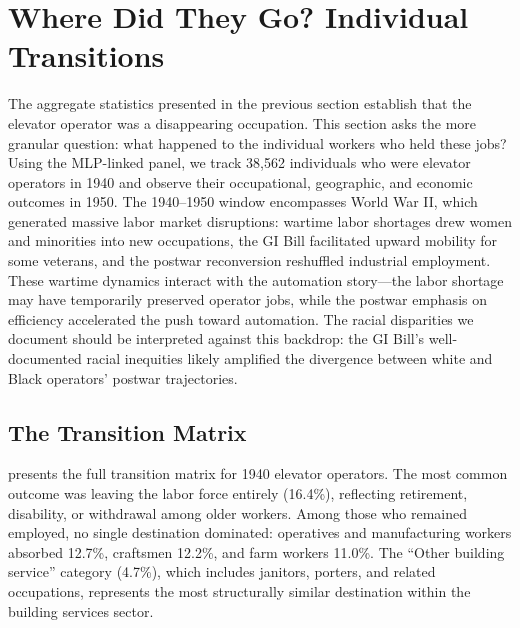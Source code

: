 \documentclass[12pt]{article}
\begin{document}

\section{Where Did They Go? Individual Transitions} \label{sec:transitions}

The aggregate statistics presented in the previous section establish that the elevator operator was a disappearing occupation. This section asks the more granular question: what happened to the individual workers who held these jobs? Using the MLP-linked panel, we track 38,562 individuals who were elevator operators in 1940 and observe their occupational, geographic, and economic outcomes in 1950. The 1940--1950 window encompasses World War II, which generated massive labor market disruptions: wartime labor shortages drew women and minorities into new occupations, the GI Bill facilitated upward mobility for some veterans, and the postwar reconversion reshuffled industrial employment. These wartime dynamics interact with the automation story---the labor shortage may have temporarily preserved operator jobs, while the postwar emphasis on efficiency accelerated the push toward automation. The racial disparities we document should be interpreted against this backdrop: the GI Bill's well-documented racial inequities \citep{katznelson2005} likely amplified the divergence between white and Black operators' postwar trajectories.

\subsection{The Transition Matrix}

 presents the full transition matrix for 1940 elevator operators. The most common outcome was leaving the labor force entirely (16.4\%), reflecting retirement, disability, or withdrawal among older workers. Among those who remained employed, no single destination dominated: operatives and manufacturing workers absorbed 12.7\%, craftsmen 12.2\%, and farm workers 11.0\%. The ``Other building service'' category (4.7\%), which includes janitors, porters, and related occupations, represents the most structurally similar destination within the building services sector.


\end{document}
